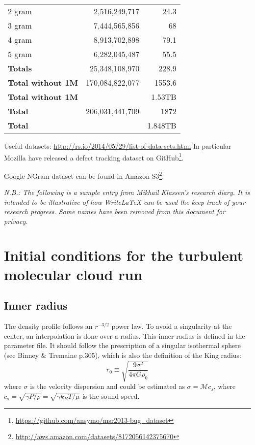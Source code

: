 \documentclass[a4paper]{tufte-handout}
\begin{document}
\begin{table}[p]
\begin{tabular}{lrr}
2 gram	&	2,516,249,717	&	24.3\\
3 gram	&	7,444,565,856	&	68\\
4 gram	&	8,913,702,898	&	79.1\\
5 gram	&	6,282,045,487	&	55.5\\
\textbf{Totals}	& 25,348,108,970	&	228.9\\
\midrule
\textbf{Total without 1M}  &	170,084,822,077 &	1553.6\\
\textbf{Total without 1M} &  &	1.53TB\\
\textbf{Total}	& 206,031,441,709 &	1872\\
\textbf{Total}	& &	1.848TB\\
\end{tabular}
\end{table}


\hrulefill



Useful datasets: \url{http://rs.io/2014/05/29/list-of-data-sets.html} In particular Mozilla have released a defect tracking dataset on GitHub\footnote{\url{https://github.com/ansymo/msr2013-bug_dataset}}\citep{Lamkanfi+13}.

Google NGram dataset can be found in Amazon S3\footnote{\url{http://aws.amazon.com/datasets/8172056142375670}}.

\hrulefill



\textit{N.B.: The following is a sample entry from Mikhail Klassen's research diary. It is intended to be illustrative of how WriteLaTeX can be used the keep track of your research progress. Some names have been removed from this document for privacy.}

\section*{Initial conditions for the turbulent molecular cloud run}

\subsection*{Inner radius}

The density profile follows an $r^{-3/2}$ power law. To avoid a singularity at the center, an interpolation is done over a radius. This inner radius is defined in the parameter file. It should follow the prescription of a singular isothermal sphere (see Binney \& Tremaine p.305), which is also the definition of the King radius:
\begin{equation}
r_0 \equiv \sqrt{\frac{9\sigma^2}{4\pi G\rho_0}}
\end{equation}
where $\sigma$ is the velocity dispersion and could be estimated as $\sigma = \mathcal{M} c_s$, where $c_s = \sqrt{\gamma P/\rho} = \sqrt{\gamma k_B T / \mu}$ is the sound speed.
\end{document}
